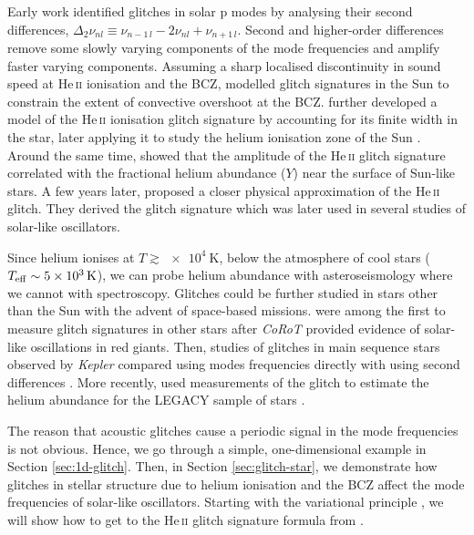Early work identified glitches in solar p modes by analysing their second differences, \(\Delta_2\nu_{nl} \equiv \nu_{n-1\,l} - 2\nu_{nl} + \nu_{n+1\,l}\). Second and higher-order differences remove some slowly varying components of the mode frequencies and amplify faster varying components. Assuming a sharp localised discontinuity in sound speed at He\,\textsc{ii} ionisation and the BCZ, \citet{Basu.Antia.ea1994,Basu1997} modelled glitch signatures in the Sun to constrain the extent of convective overshoot at the BCZ. \citet{Monteiro.Thompson1998} further developed a model of the He\,\textsc{ii} ionisation glitch signature by accounting for its finite width in the star, later applying it to study the helium ionisation zone of the Sun \citep{Monteiro.Thompson2005}. Around the same time, \citet{Basu.Mazumdar.ea2004} showed that the amplitude of the He\,\textsc{ii} glitch signature correlated with the fractional helium abundance (\(Y\)) near the surface of Sun-like stars. A few years later, \citet{Houdek.Gough2007} proposed a closer physical approximation of the He\,\textsc{ii} glitch. They derived the glitch signature which was later used in several studies of solar-like oscillators.

Since helium ionises at \(T \gtrsim \SI{e4}{\kelvin}\), below the atmosphere of cool stars (\({T_\mathrm{eff}} \sim \SI{5e3}{\kelvin}\)), we can probe helium abundance with asteroseismology where we cannot with spectroscopy. Glitches could be further studied in stars other than the Sun with the advent of space-based missions. \citet{Miglio.Montalban.ea2010,Mazumdar.Michel.ea2012} were among the first to measure glitch signatures in other stars after \emph{CoRoT} \citep{Baglin.Auvergne.ea2006} provided evidence of solar-like oscillations in red giants. Then, studies of glitches in main sequence stars observed by \emph{Kepler} \citep{Borucki.Koch.ea2010} compared using modes frequencies directly with using second differences \citep{Mazumdar.Monteiro.ea2012,Mazumdar.Monteiro.ea2014,Verma.Raodeo.ea2017}. More recently, \citet{Verma.Raodeo.ea2019} used measurements of the glitch to estimate the helium abundance for the LEGACY sample of stars \citet{Lund.SilvaAguirre.ea2017}.

The reason that acoustic glitches cause a periodic signal in the mode frequencies is not obvious. Hence, we go through a simple, one-dimensional example in Section \ref{sec:1d-glitch}. Then, in Section \ref{sec:glitch-star}, we demonstrate how glitches in stellar structure due to helium ionisation and the BCZ affect the mode frequencies of solar-like oscillators. Starting with the variational principle \citep{Chandrasekhar1964}, we will show how to get to the He\,\textsc{ii} glitch signature formula from \citet{Houdek.Gough2007}.

